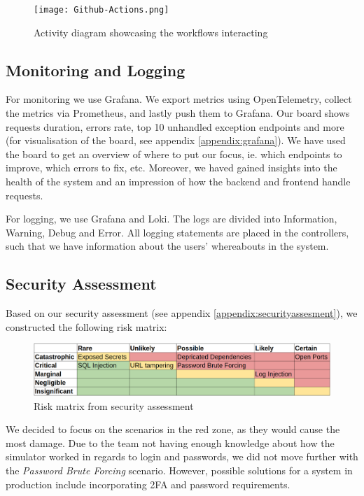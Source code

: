 \begin{figure}[H]
    \centering
    \texttt{[image: Github-Actions.png]}
    \caption{Activity diagram showcasing the workflows interacting }
    \label{fig:workflows}
\end{figure}

\subsection{Monitoring and Logging}
For monitoring we use Grafana. We export metrics using OpenTelemetry, collect the metrics via Prometheus, and lastly push them to Grafana. Our board shows requests duration, errors rate, top 10 unhandled exception endpoints and more (for visualisation of the board, see appendix \ref{appendix:grafana}). We have used the board to get an overview of where to put our focus, ie. which endpoints to improve, which errors to fix, etc. Moreover, we haved gained insights into the health of the system and an impression of how the backend and frontend handle requests.

For logging, we use Grafana and Loki. The logs are divided into Information, Warning, Debug and Error. All logging statements are placed in the controllers, such that we have information about the users' whereabouts in the system.

\subsection{Security Assessment}
Based on our security assessment (see appendix \ref{appendix:securityassesment}), we constructed the following risk matrix:
\begin{figure}[H]
    \centering
    \includegraphics[width=1\linewidth]{images/risk-matrix.png}
    \caption{Risk matrix from security assessment}
    \label{fig:enter-label}
\end{figure}
We decided to focus on the scenarios in the red zone, as they would cause the most damage. Due to the team not having enough knowledge about how the simulator worked in regards to login and passwords, we did not move further with the \textit{Password Brute Forcing} scenario. However, possible solutions for a system in production include incorporating 2FA and password requirements.

